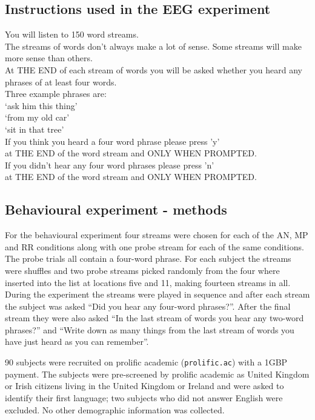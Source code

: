 \documentclass[11pt,a4wide]{article}
\begin{document}
\subsection*{Instructions used in the EEG experiment}

You will listen to 150 word streams. \\[0.5cm]
The streams of words don't always make a lot of sense.
Some streams will make more sense than others.\\[0.5cm]
At THE END of each stream of words you will be asked whether
you heard any phrases of at least four words.\\[0.5cm]
Three example phrases are:\\[0.5cm]
`ask him this thing'  \\
`from my old car'\\
`sit in that tree'\\[0.5cm]
If you think you heard a four word phrase please press 'y'\\
at THE END of the word stream and ONLY WHEN PROMPTED.\\[0.5cm]
If you didn't hear any four word phrases please press 'n'\\
at THE END of the word stream and ONLY WHEN PROMPTED.\\

\newpage


\subsection*{Behavioural experiment - methods}

For the behavioural experiment four streams were chosen for each of
the AN, MP and RR conditions along with one probe stream for each of
the same conditions. The probe trials all contain a four-word
phrase. For each subject the streams were shuffles and two probe
streams picked randomly from the four where inserted into the list at
locations five and 11, making fourteen streams in all. During the
experiment the streams were played in sequence and after each stream
the subject was asked ``Did you hear any four-word phrases?''. After
the final stream they were also asked ``In the last stream of words
you hear any two-word phrases?'' and ``Write down as many things from
the last stream of words you have just heard as you can remember''.

90 subjects were recruited on prolific academic (\texttt{prolific.ac})
with a 1GBP payment. The subjects were pre-screened by prolific academic
as United Kingdom or Irish citizens living in the United Kingdom or
Ireland and were asked to identify their first language; two subjects
who did not answer English were excluded. No other demographic
information was collected.
\end{document}
